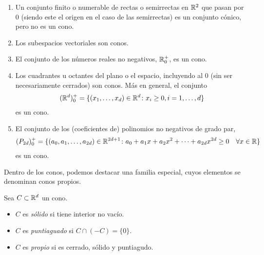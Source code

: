 \begin{example} \label{ex:conos}
    \begin{enumerate}
        \item Un conjunto finito o numerable de rectas o semirrectas en $\mathbb{R}^2$ que pasan por 0 (siendo este el origen en el caso de las semirrectas) es un conjunto cónico, pero no es un cono.
        \item Los subespacios vectoriales son conos.
        \item El conjunto de los números reales no negativos, $\mathbb{R}^+_0$, es un cono.
        \item Los cuadrantes u octantes del plano o el espacio, incluyendo al 0 (sin ser necesariamente cerrados) son conos. Más en general, el conjunto
                \[ (\mathbb{R}^d)^+_0 = \{(x_1,\dots,x_d) \in \mathbb{R}^d \colon x_i \ge 0, i = 1,\dots,d \} \]
              es un cono.
        \item El conjunto de los (coeficientes de) polinomios no negativos de grado par,
                \[ (P_{2d})^+_0 = \{(a_0,a_1,\dots,a_{2d}) \in \mathbb{R}^{2d+1} \colon a_0 + a_1x+a_2x^2+\dots+a_{2d}x^{2d} \ge 0\quad \forall x \in \mathbb{R} \} \]
              es un cono.
    \end{enumerate}
\end{example}

Dentro de los conos, podemos destacar una familia especial, cuyos elementos se denominan conos propios.

\begin{definition}
    Sea $C \subset \mathbb{R}^d$ un cono.
    \begin{itemize}
        \item $C$ es \emph{sólido} si tiene interior no vacío.
        \item $C$ es \emph{puntiaguado} si $C \cap (-C) = \{0\}$.
        \item $C$ es \emph{propio} si es cerrado, sólido y puntiagudo.
    \end{itemize}
\end{definition}

